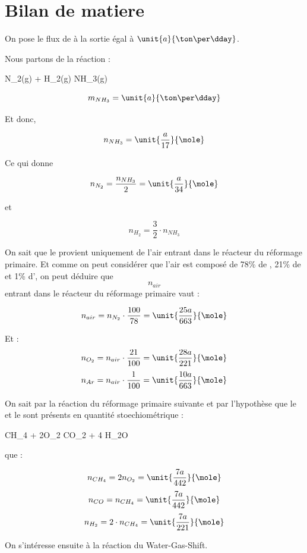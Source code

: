 \documentclass{article}
\begin{document}
\section{Bilan de matiere}
On pose le flux de  à la sortie égal à $\unit{a}{\ton\per\dday}$. 

Nous partons de la réaction : 
\begin{chemmath}
		N_2(g) + H_2(g) \longrightarrow NH_3(g) 
\end{chemmath}
 	
$$m_{NH_3} = \unit{a}{\ton\per\dday}$$ 

Et donc, 
 
$$n_{NH_3} = \unit{\frac{a}{17}}{\mole}$$

Ce qui donne 

$$n_{N_2} = \frac{n_{NH_3}}{2} = \unit{\frac{a}{34}}{\mole}$$ 

et 

$$n_{H_2} = \frac{3}{2} \cdot n_{NH_3}$$

On sait que le  provient uniquement de l'air entrant 
dans le réacteur du  réformage primaire. Et comme on peut considérer
que l'air est composé de 78\% de , 21\% de 
et 1\% d', on peut déduire que $$n_{air}$$ entrant dans le 
réacteur du réformage primaire vaut : 

$$n_{air}= n_{N_2} \cdot \frac{100}{78} = \unit{\frac{25a}{663}}{\mole}$$ 

Et :
$$n_{O_2}= n_{air} \cdot \frac{21}{100} = \unit{\frac{28a}{221}}{\mole}$$
$$n_{Ar}= n_{air} \cdot \frac{1}{100} = \unit{\frac{10a}{663}}{\mole}$$

On sait par la réaction du réformage primaire suivante et par l'hypothèse que le
 et le  sont présents en quantité stoechiométrique : 

\begin{chemmath}
	CH_4 + 2O_2 \Longrightarrow CO_2 + 4 H_2O
\end{chemmath} 

que :

$$n_{CH_4} = 2n_{O_2} = \unit{\frac{7a}{442}}{\mole}$$
$$n_{CO} = n_{CH_4} =  \unit{\frac{7a}{442}} {\mole}$$
$$n_{H_2} = 2 \cdot n_{CH_4} =  \unit{\frac{7a}{221}}{\mole}$$

On s'intéresse ensuite à la réaction du Water-Gas-Shift.
\end{document}
